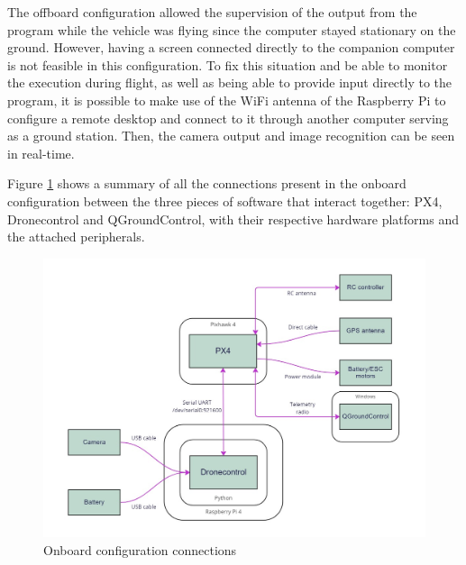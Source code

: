 The offboard configuration allowed the supervision of the output from the program while the vehicle was flying since the computer stayed stationary on the ground. 
However, having a screen connected directly to the companion computer is not feasible in this configuration.
To fix this situation and be able to monitor the execution during flight, as well as being able to provide input directly to the program, it is possible to make use of the WiFi antenna of the Raspberry Pi to configure a remote desktop and connect to it through another computer serving as a ground station.
Then, the camera output and image recognition can be seen in real-time.

Figure \ref{fig:onboard-config} shows a summary of all the connections present in the onboard configuration between the three pieces of software that interact together: PX4, Dronecontrol and QGroundControl, with their respective hardware platforms and the attached peripherals.

\begin{figure}
  \centering
  \includegraphics[width=\textwidth,keepaspectratio]{img/onboard-diagram.jpg}
  \caption{Onboard configuration connections}
  \label{fig:onboard-config}
\end{figure}
